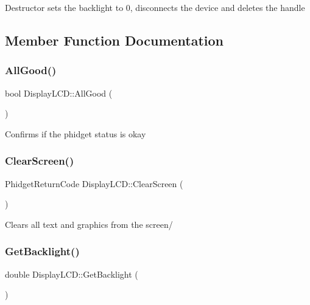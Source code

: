 Destructor sets the backlight to 0, disconnects the device and deletes the handle

\subsection{Member Function Documentation}
\mbox{\label{classDisplayLCD_ada423180074b506b76c1bce2ee0762bd}} 
\subsubsection{\texorpdfstring{All\+Good()}{AllGood()}}
{\footnotesize\ttfamily bool Display\+L\+C\+D\+::\+All\+Good (\begin{DoxyParamCaption}{ }\end{DoxyParamCaption})\hspace{0.3cm}{\ttfamily [inline]}}

Confirms if the phidget status is okay\mbox{\label{classDisplayLCD_ac3ea2662388a42733fbf525f3d933be7}} 
\subsubsection{\texorpdfstring{Clear\+Screen()}{ClearScreen()}}
{\footnotesize\ttfamily Phidget\+Return\+Code Display\+L\+C\+D\+::\+Clear\+Screen (\begin{DoxyParamCaption}{ }\end{DoxyParamCaption})\hspace{0.3cm}{\ttfamily [inline]}}

Clears all text and graphics from the screen/\mbox{\label{classDisplayLCD_af9aa55093dd8b4a11489b2e490aed8cc}} 
\subsubsection{\texorpdfstring{Get\+Backlight()}{GetBacklight()}}
{\footnotesize\ttfamily double Display\+L\+C\+D\+::\+Get\+Backlight (\begin{DoxyParamCaption}{ }\end{DoxyParamCaption})\hspace{0.3cm}{\ttfamily [inline]}}

